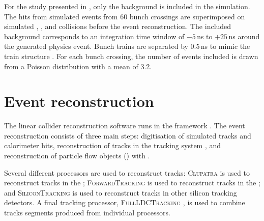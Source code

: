 
For the study presented in , only the \ggHad background is included in the simulation. The hits from simulated \ggHad events from 60 bunch crossings are superimposed on simulated \ee, \Egamma, and \Gammagamma collisions before the event reconstruction. The included background corresponds to an integration time window of $-5$\,ns to $+25$\,ns around the generated physics event. Bunch trains are separated by 0.5\,ns to mimic the \CLIC train structure \cite{Linssen:2012hp}. For each bunch crossing, the number of \ggHad events included is drawn from a Poisson distribution with a mean of 3.2.






\section{Event reconstruction}

The linear collider reconstruction software runs in the \Marlin framework \cite{Gaede:2006pj}. The event reconstruction consists of three main steps: digitisation of simulated tracks and calorimeter hits, reconstruction of tracks in the tracking system \cite{Gaede:2014aza}, and reconstruction of particle flow objects (\PFOs) with \pandora\cite{Thomson:2009rp,Marshall:2012ry}.


Several different \Marlin processors are used to reconstruct tracks: \textsc{Clupatra} \cite{Gaede:2014aza} is used to reconstruct tracks in the \TPC; \textsc{ForwardTracking} \cite{Gaede:2014aza} is used to reconstruct tracks in the \FTD; and \textsc{SiliconTracking} \cite{Gaede:2014aza} is used to reconstruct tracks in other silicon tracking detectors. A final \Marlin tracking processor, \textsc{FullLDCTracking} \cite{Gaede:2014aza}, is used to combine tracks segments produced from individual processors.

